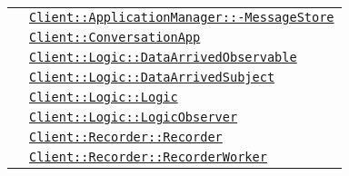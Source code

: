\begin{longtable}{|>{\centering}m{3cm}|m{10cm}<{\centering}|}
& \hyperref[Client::ApplicationManager::MessageStore]{\texttt{Client::ApplicationManager::-\linebreak MessageStore}}\\
& \hyperref[Client::ConversationApp]{\texttt{Client::ConversationApp}}\\
& \hyperref[Client::Logic::DataArrivedObservable]{\texttt{Client::Logic::DataArrivedObservable}}\\
& \hyperref[Client::Logic::DataArrivedSubject]{\texttt{Client::Logic::DataArrivedSubject}}\\
& \hyperref[Client::Logic::Logic]{\texttt{Client::Logic::Logic}}\\
& \hyperref[Client::Logic::LogicObserver]{\texttt{Client::Logic::LogicObserver}}\\
& \hyperref[Client::Recorder::Recorder]{\texttt{Client::Recorder::Recorder}}\\
& \hyperref[Client::Recorder::RecorderWorker]{\texttt{Client::Recorder::RecorderWorker}}\\ \hline


\end{longtable}
